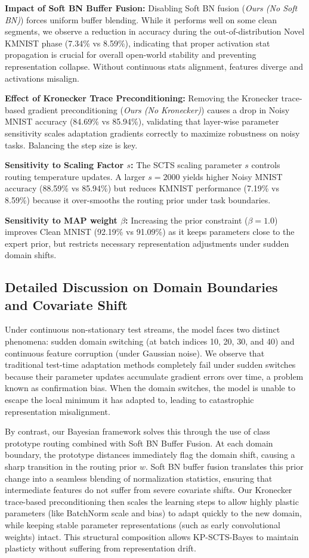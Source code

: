 \documentclass{article}
\theoremstyle{plain}
\theoremstyle{definition}
\theoremstyle{remark}
\begin{document}
\textbf{Impact of Soft BN Buffer Fusion:} Disabling Soft BN fusion (\textit{Ours (No Soft BN)}) forces uniform buffer blending. While it performs well on some clean segments, we observe a reduction in accuracy during the out-of-distribution Novel KMNIST phase (7.34\% vs 8.59\%), indicating that proper activation stat propagation is crucial for overall open-world stability and preventing representation collapse. Without continuous stats alignment, features diverge and activations misalign.

\textbf{Effect of Kronecker Trace Preconditioning:} Removing the Kronecker trace-based gradient preconditioning (\textit{Ours (No Kronecker)}) causes a drop in Noisy MNIST accuracy (84.69\% vs 85.94\%), validating that layer-wise parameter sensitivity scales adaptation gradients correctly to maximize robustness on noisy tasks. Balancing the step size is key.

\textbf{Sensitivity to Scaling Factor $s$:} The SCTS scaling parameter $s$ controls routing temperature updates. A larger $s=2000$ yields higher Noisy MNIST accuracy (88.59\% vs 85.94\%) but reduces KMNIST performance (7.19\% vs 8.59\%) because it over-smooths the routing prior under task boundaries.

\textbf{Sensitivity to MAP weight $\beta$:} Increasing the prior constraint ($\beta=1.0$) improves Clean MNIST (92.19\% vs 91.09\%) as it keeps parameters close to the expert prior, but restricts necessary representation adjustments under sudden domain shifts.

\subsection{Detailed Discussion on Domain Boundaries and Covariate Shift}
Under continuous non-stationary test streams, the model faces two distinct phenomena: sudden domain switching (at batch indices 10, 20, 30, and 40) and continuous feature corruption (under Gaussian noise). We observe that traditional test-time adaptation methods completely fail under sudden switches because their parameter updates accumulate gradient errors over time, a problem known as confirmation bias. When the domain switches, the model is unable to escape the local minimum it has adapted to, leading to catastrophic representation misalignment.

By contrast, our Bayesian framework solves this through the use of class prototype routing combined with Soft BN Buffer Fusion. At each domain boundary, the prototype distances immediately flag the domain shift, causing a sharp transition in the routing prior $w$. Soft BN buffer fusion translates this prior change into a seamless blending of normalization statistics, ensuring that intermediate features do not suffer from severe covariate shifts. Our Kronecker trace-based preconditioning then scales the learning steps to allow highly plastic parameters (like BatchNorm scale and bias) to adapt quickly to the new domain, while keeping stable parameter representations (such as early convolutional weights) intact. This structural composition allows KP-SCTS-Bayes to maintain plasticty without suffering from representation drift.
\end{document}
